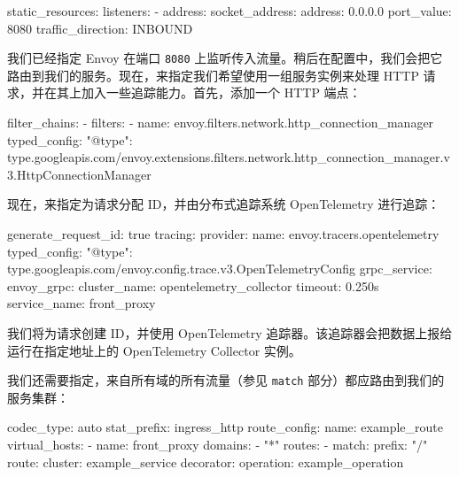 \begin{codebox}[yaml]
static_resources:
  listeners:
  - address:
      socket_address:
        address: 0.0.0.0
        port_value: 8080
    traffic_direction: INBOUND
\end{codebox}

我们已经指定 Envoy 在端口 \texttt{8080} 上监听传入流量。稍后在配置中，我们会把它路由到我们的服务。现在，来指定我们希望使用一组服务实例来处理 HTTP 请求，并在其上加入一些追踪能力。首先，添加一个 HTTP 端点：

\begin{codebox}[yaml]
    filter_chains:
      - filters:
          - name: envoy.filters.network.http_connection_manager
            typed_config:
              "@type": type.googleapis.com/envoy.extensions.filters.network.http_connection_manager.v3.HttpConnectionManager
\end{codebox}

现在，来指定为请求分配 ID，并由分布式追踪系统 OpenTelemetry 进行追踪：

\begin{codebox}[yaml]
              generate_request_id: true
                tracing:
                  provider:
                    name: envoy.tracers.opentelemetry
                    typed_config:
                      "@type": type.googleapis.com/envoy.config.trace.v3.OpenTelemetryConfig
                      grpc_service:
                        envoy_grpc:
                          cluster_name: opentelemetry_collector
                        timeout: 0.250s
                      service_name: front_proxy
\end{codebox}

\label{idx:410}
我们将为请求创建 ID，并使用 OpenTelemetry 追踪器。该追踪器会把数据上报给运行在指定地址上的 OpenTelemetry Collector 实例。

\label{idx:411}
我们还需要指定，来自所有域的所有流量（参见 \texttt{match} 部分）都应路由到我们的服务集群：

\begin{codebox}[yaml]
              codec_type: auto
              stat_prefix: ingress_http
              route_config:
                name: example_route
                virtual_hosts:
                  - name: front_proxy
                    domains:
                      - "*"
                    routes:
                      - match:
                          prefix: "/"
                        route:
                          cluster: example_service
                        decorator:
                          operation: example_operation
\end{codebox}

